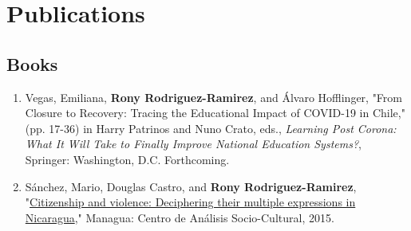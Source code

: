 \documentclass[a4paper, 10pt]{article}
\renewenvironment{itemize}{
  \begin{list}{}
    { \setlength{\itemsep}{5pt}
      \setlength{\parsep}{0pt}
      \setlength{\topsep}{0pt}
      \setlength{\leftmargin}{0em} } }{
  \end{list}}
\begin{document}





\section*{Publications}

\subsection*{Books}

\begin{enumerate}[leftmargin=10pt, label={}, itemindent=-10pt, nosep]
\item Vegas, Emiliana, \textbf{Rony Rodriguez-Ramirez}, and Álvaro Hofflinger, "From
Closure to Recovery: Tracing the Educational Impact of COVID-19 in Chile," (pp.
17-36) in Harry Patrinos and Nuno Crato, eds., \textit{Learning Post Corona: What It Will Take to
Finally Improve National Education Systems?}, Springer: Washington, D.C.
Forthcoming. 
\item Sánchez, Mario, Douglas Castro, and \textbf{Rony Rodriguez-Ramirez},
"\href{http://biblioteca.clacso.edu.ar/Nicaragua/casc-uca/20150313124733/Ciudadania-y-violencia.pdf}{Citizenship
and violence: Deciphering their multiple expressions in Nicaragua}," Managua:
Centro de Análisis Socio-Cultural, 2015. 
\end{enumerate}
\end{document}
